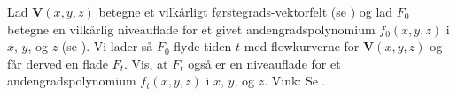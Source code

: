 \begin{exercise}[(Advanced)]\label{exercDiffSys}
Lad $\mathbf{V}(x,y,z)$ betegne et vilkårligt førstegrads-vektorfelt (se ) og lad $F_{0}$ betegne en vilkårlig niveauflade for et givet andengradspolynomium $f_{0}(x,y,z)$ i $x$, $y$, og $z$ (se ). Vi lader så  $F_{0}$ flyde tiden $t$ med flowkurverne for $\mathbf{V}(x,y,z)$ og får derved en flade $F_{t}$. Vis, at $F_{t}$ også er en niveauflade for et andengradspolynomium $f_{t}(x,y,z)$ i $x$, $y$, og $z$. Vink: Se .
\end{exercise}







